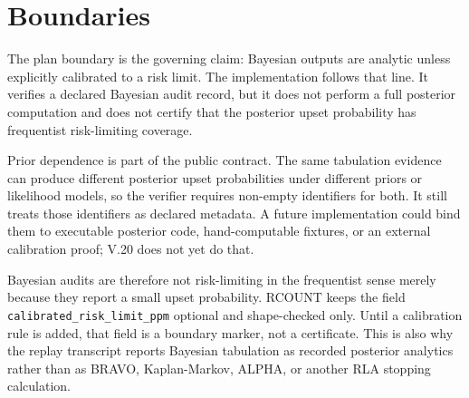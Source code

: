 \section{Boundaries}

The plan boundary is the governing claim: Bayesian outputs are analytic unless
explicitly calibrated to a risk limit. The implementation follows that line. It
verifies a declared Bayesian audit record, but it does not perform a full
posterior computation and does not certify that the posterior upset probability
has frequentist risk-limiting coverage.

Prior dependence is part of the public contract. The same tabulation evidence
can produce different posterior upset probabilities under different priors or
likelihood models, so the verifier requires non-empty identifiers for both. It
still treats those identifiers as declared metadata. A future implementation
could bind them to executable posterior code, hand-computable fixtures, or an
external calibration proof; V.20 does not yet do that.

Bayesian audits are therefore not risk-limiting in the frequentist sense merely
because they report a small upset probability. RCOUNT keeps the field
\texttt{calibrated\_risk\_limit\_ppm} optional and shape-checked only. Until a
calibration rule is added, that field is a boundary marker, not a certificate.
This is also why the replay transcript reports Bayesian tabulation as recorded
posterior analytics rather than as BRAVO, Kaplan-Markov, ALPHA, or another RLA
stopping calculation.
